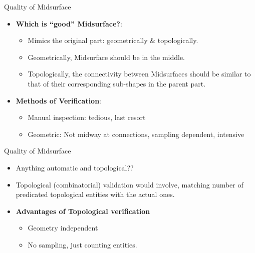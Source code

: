 
\begin{frame}{Quality of Midsurface}
\begin{itemize}[noitemsep,label=\textbullet,topsep=2pt,parsep=2pt,partopsep=2pt]
\item \textbf{Which is ``good'' Midsurface?}:
	\begin{itemize}[noitemsep,label=\textbullet,topsep=2pt,parsep=2pt,partopsep=2pt]
	\item  Mimics the original part: geometrically \& topologically. 
	\item Geometrically,  Midsurface should be in the middle. 
	\item Topologically, the connectivity between Midsurfaces should be similar to that of their corresponding sub-shapes in the parent part.
	\end{itemize}
\item \textbf{Methods of Verification}:
	\begin{itemize}[noitemsep,label=\textbullet,topsep=2pt,parsep=2pt,partopsep=2pt]
	\item Manual inspection: tedious, last resort
	\item Geometric: Not midway at connections, sampling dependent, intensive
	\end{itemize}
\end{itemize}

\end{frame}

\begin{frame}{Quality of Midsurface}
\begin{itemize}[noitemsep,label=\textbullet,topsep=2pt,parsep=2pt,partopsep=2pt]
\item Anything automatic and topological??
\item Topological (combinatorial) validation would involve, matching number of predicated topological entities with the actual ones.
\item \textbf{Advantages of Topological verification}
	\begin{itemize}[noitemsep,label=\textbullet,topsep=2pt,parsep=2pt,partopsep=2pt]
	\item  Geometry independent
	\item No sampling, just counting entities. 
	\end{itemize}
\end{itemize}

\end{frame}

